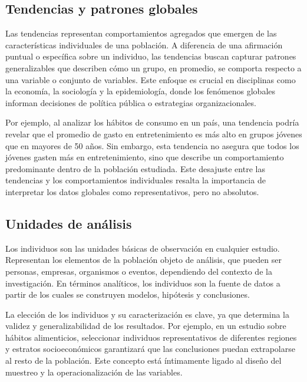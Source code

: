 \documentclass[
  letterpaper,
  DIV=11,
  numbers=noendperiod]{scrreprt}
\begin{document}
\subsection{Tendencias y patrones
globales}\label{tendencias-y-patrones-globales}

Las tendencias representan comportamientos agregados que emergen de las
características individuales de una población. A diferencia de una
afirmación puntual o específica sobre un individuo, las tendencias
buscan capturar patrones generalizables que describen cómo un grupo, en
promedio, se comporta respecto a una variable o conjunto de variables.
Este enfoque es crucial en disciplinas como la economía, la sociología y
la epidemiología, donde los fenómenos globales informan decisiones de
política pública o estrategias organizacionales.

Por ejemplo, al analizar los hábitos de consumo en un país, una
tendencia podría revelar que el promedio de gasto en entretenimiento es
más alto en grupos jóvenes que en mayores de 50 años. Sin embargo, esta
tendencia no asegura que todos los jóvenes gasten más en
entretenimiento, sino que describe un comportamiento predominante dentro
de la población estudiada. Este desajuste entre las tendencias y los
comportamientos individuales resalta la importancia de interpretar los
datos globales como representativos, pero no absolutos.

\subsection{Unidades de análisis}\label{unidades-de-anuxe1lisis}

Los individuos son las unidades básicas de observación en cualquier
estudio. Representan los elementos de la población objeto de análisis,
que pueden ser personas, empresas, organismos o eventos, dependiendo del
contexto de la investigación. En términos analíticos, los individuos son
la fuente de datos a partir de los cuales se construyen modelos,
hipótesis y conclusiones.

La elección de los individuos y su caracterización es clave, ya que
determina la validez y generalizabilidad de los resultados. Por ejemplo,
en un estudio sobre hábitos alimenticios, seleccionar individuos
representativos de diferentes regiones y estratos socioeconómicos
garantizará que las conclusiones puedan extrapolarse al resto de la
población. Este concepto está íntimamente ligado al diseño del muestreo
y la operacionalización de las variables.
\end{document}
